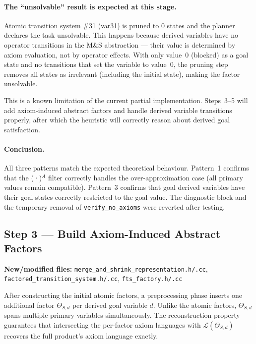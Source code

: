 \documentclass[11pt,a4paper]{article}
\begin{document}
\paragraph{The ``unsolvable'' result is expected at this stage.}
Atomic transition system \#31 (var31) is pruned to 0 states and the planner
declares the task unsolvable.  This happens because derived variables have no
operator transitions in the M\&S abstraction --- their value is determined by
axiom evaluation, not by operator effects.  With only value~0 (blocked) as a
goal state and no transitions that set the variable to value~0, the pruning
step removes all states as irrelevant (including the initial state), making
the factor unsolvable.

This is a known limitation of the current partial implementation.  Steps~3--5
will add axiom-induced abstract factors and handle derived variable
transitions properly, after which the heuristic will correctly reason about
derived goal satisfaction.

\paragraph{Conclusion.}
All three patterns match the expected theoretical behaviour.  Pattern~1
confirms that the (·)$^A$ filter correctly handles the over-approximation
case (all primary values remain compatible).  Pattern~3 confirms that goal
derived variables have their goal states correctly restricted to the goal
value.  The diagnostic block and the temporary removal of
\texttt{verify\_no\_axioms} were reverted after testing.

\subsection{Step 3 — Build Axiom-Induced Abstract Factors}
\textbf{New/modified files:}
\texttt{merge\_and\_shrink\_representation.h/.cc},
\texttt{factored\_transition\_system.h/.cc},
\texttt{fts\_factory.h/.cc}

After constructing the initial atomic factors, a preprocessing phase inserts
one additional factor $\Theta_{S,d}$ per derived goal variable $d$.  Unlike
the atomic factors, $\Theta_{S,d}$ spans multiple primary variables
simultaneously.  The reconstruction property guarantees that intersecting the
per-factor axiom languages with $\mathcal{L}(\Theta_{S,d})$ recovers the full
product's axiom language exactly.
\end{document}
